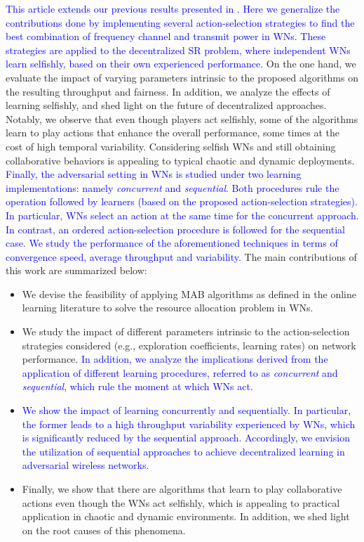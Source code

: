 \documentclass[preprint,12pt]{elsarticle}
\begin{document}
	\textcolor{blue}{This article extends our previous results presented in \cite{wilhelmi2017implications}. Here we generalize the contributions done by implementing several action-selection strategies to find the best combination of frequency channel and transmit power in WNs. These strategies are applied to the decentralized SR problem, where independent WNs learn selfishly, based on their own experienced performance.} On the one hand, we evaluate the impact of varying parameters intrinsic to the proposed algorithms on the resulting throughput and fairness. In addition, we analyze the effects of learning selfishly, and shed light on the future of decentralized approaches. Notably, we observe that even though players act selfishly, some of the algorithms learn to play actions that enhance the overall performance, some times at the cost of high temporal variability. Considering selfish WNs and still obtaining collaborative behaviors is appealing to typical chaotic and dynamic deployments. \textcolor{blue}{Finally, the adversarial setting in WNs is studied under two learning implementations: namely \textit{concurrent} and \textit{sequential}. Both procedures rule the operation followed by learners (based on the proposed action-selection strategies). In particular, WNs select an action at the same time for the concurrent approach. In contrast, an ordered action-selection procedure is followed for the sequential case. We study the performance of the aforementioned techniques in terms of convergence speed, average throughput and variability.} The main contributions of this work are summarized below:
	\begin{itemize}		
		\item We devise the feasibility of applying MAB algorithms as defined in the online learning literature to solve the resource allocation problem in WNs.
		\item We study the impact of different parameters intrinsic to the action-selection strategies considered (e.g., exploration coefficients, learning rates) on network performance. \textcolor{blue}{In addition, we analyze the implications derived from the application of different learning procedures, referred to as \textit{concurrent} and \textit{sequential}, which rule the moment at which WNs act.}
		\item \textcolor{blue}{We show the impact of learning concurrently and sequentially. In particular, the former leads to a high throughput variability experienced by WNs, which is significantly reduced by the sequential approach.} \textcolor{blue}{Accordingly, we envision the utilization of sequential approaches to achieve decentralized learning in adversarial wireless networks.}
		\item Finally, we show that there are algorithms that learn to play collaborative actions even though the WNs act selfishly, which is appealing to practical application in chaotic and dynamic environments. In addition, we shed light on the root causes of this phenomena.  
	\end{itemize}
	
\end{document}
